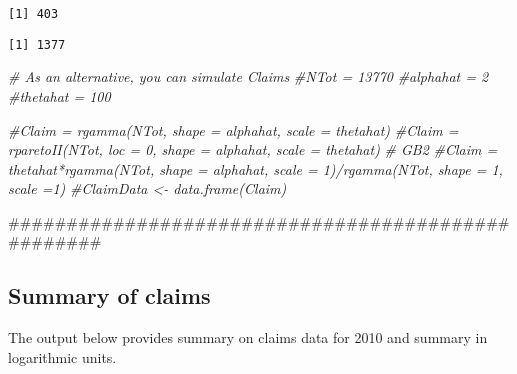 \documentclass[]{book}
\newenvironment{Shaded}{\begin{snugshade}}{\end{snugshade}}
\newcommand{\KeywordTok}[1]{\textcolor[rgb]{0.13,0.29,0.53}{\textbf{#1}}}
\newcommand{\DecValTok}[1]{\textcolor[rgb]{0.00,0.00,0.81}{#1}}
\newcommand{\StringTok}[1]{\textcolor[rgb]{0.31,0.60,0.02}{#1}}
\newcommand{\CommentTok}[1]{\textcolor[rgb]{0.56,0.35,0.01}{\textit{#1}}}
\newcommand{\OperatorTok}[1]{\textcolor[rgb]{0.81,0.36,0.00}{\textbf{#1}}}
\newcommand{\NormalTok}[1]{#1}
\theoremstyle{definition}
\theoremstyle{definition}
\theoremstyle{definition}
\theoremstyle{remark}
\begin{document}
\begin{Shaded}
\end{Shaded}

\begin{verbatim}
[1] 403
\end{verbatim}

\begin{Shaded}
\end{Shaded}

\begin{verbatim}
[1] 1377
\end{verbatim}

\begin{Shaded}
\begin{Highlighting}[]
\CommentTok{# As an alternative, you can simulate Claims}
\CommentTok{#NTot = 13770}
\CommentTok{#alphahat = 2}
\CommentTok{#thetahat =  100}

\CommentTok{#Claim = rgamma(NTot, shape = alphahat, scale = thetahat)}
\CommentTok{#Claim = rparetoII(NTot, loc = 0,  shape = alphahat, scale = thetahat)}
\CommentTok{# GB2}
\CommentTok{#Claim = thetahat*rgamma(NTot, shape = alphahat, scale = 1)/rgamma(NTot, shape = 1, scale =1) }
\CommentTok{#ClaimData <- data.frame(Claim)}

\NormalTok{###################################################}
\end{Highlighting}
\end{Shaded}

\subsection{Summary of claims}\label{summary-of-claims}

The output below provides summary on claims data for 2010 and summary in
logarithmic units.

\begin{Shaded}
\end{Shaded}
\end{document}
